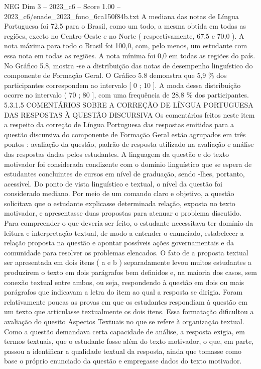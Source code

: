\begin{textsample}{NEG Dim 3 – 2023\_c6 – Score 1.00 – 2023\_c6/enade\_2023\_fono\_6ca150f84b.txt}
A mediana das notas de Língua Portuguesa foi 72,5 para o Brasil, como um todo, a mesma obtida em todas as regiões, exceto no Centro-Oeste e no Norte ( respectivamente, 67,5 e 70,0 ).
A nota máxima para todo o Brasil foi 100,0, com, pelo menos, um estudante com essa nota em todas as regiões.
A nota mínima foi 0,0 em todas as regiões do país.
No Gráfico 5.8, mostra -se a distribuição das notas de desempenho linguístico do componente de Formação Geral.
O Gráfico 5.8 demonstra que 5,9 \% dos participantes correspondem ao intervalo [ 0 ; 10 ].
A moda dessa distribuição ocorre no intervalo ( 70 ; 80 ], com uma frequência de 28,8 \% dos participantes. 5.3.1.5 COMENTÁRIOS SOBRE A CORREÇÃO DE LÍNGUA PORTUGUESA DAS RESPOSTAS À QUESTÃO DISCURSIVA Os comentários feitos neste item a respeito da correção de Língua Portuguesa das respostas emitidas para a questão discursiva do componente de Formação Geral estão agrupados em três pontos : avaliação da questão, padrão de resposta utilizado na avaliação e análise das respostas dadas pelos estudantes.
A linguagem da questão e do texto motivador foi considerada condizente com o domínio linguístico que se espera de estudantes concluintes de cursos em nível de graduação, sendo -lhes, portanto, acessível.
Do ponto de vista linguístico e textual, o nível da questão foi considerado mediano.
Por meio de um comando claro e objetivo, a questão solicitava que o estudante explicasse determinada relação, exposta no texto motivador, e apresentasse duas propostas para atenuar o problema discutido.
Para compreender o que deveria ser feito, o estudante necessitava ter domínio da leitura e interpretação textual, de modo a entender o enunciado, estabelecer a relação proposta na questão e apontar possíveis ações governamentais e da comunidade para resolver os problemas elencados.
O fato de a proposta textual ser apresentada em dois itens ( a e b ) separadamente levou muitos estudantes a produzirem o texto em dois parágrafos bem definidos e, na maioria dos casos, sem conexão textual entre ambos, ou seja, respondendo à questão em dois ou mais parágrafos que indicavam a letra do item ao qual a resposta se dirigia.
Foram relativamente poucas as provas em que os estudantes respondiam à questão em um texto que articulasse textualmente os dois itens.
Essa formatação dificultou a avaliação do quesito Aspectos Textuais no que se refere à organização textual.
Como a questão demandava certa capacidade de análise, a resposta exigia, em termos textuais, que o estudante fosse além do texto motivador, o que, em parte, passou a identificar a qualidade textual da resposta, ainda que tomasse como base o próprio enunciado da questão e empregasse dados do texto motivador.

\end{textsample}
